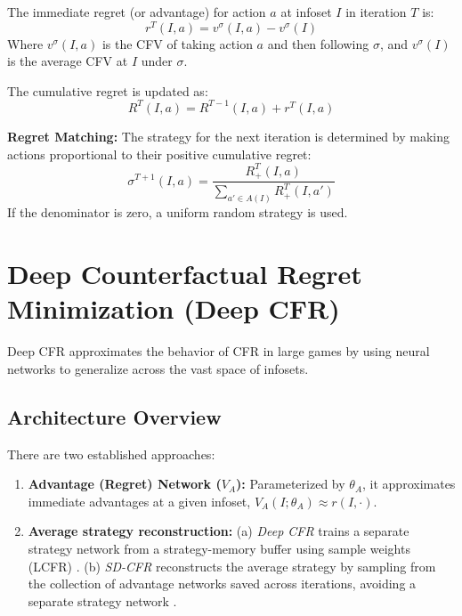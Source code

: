 \documentclass[11pt,a4paper]{article}
\begin{document}
The immediate regret (or advantage) for action $a$ at infoset $I$ in iteration $T$ is:
\begin{equation}
r^T(I, a) = v^\sigma(I, a) - v^\sigma(I)
\end{equation}
Where $v^\sigma(I, a)$ is the CFV of taking action $a$ and then following $\sigma$, and $v^\sigma(I)$ is the average CFV at $I$ under $\sigma$.

The cumulative regret is updated as:
\begin{equation}
R^T(I, a) = R^{T-1}(I, a) + r^T(I, a)
\end{equation}

\textbf{Regret Matching:} The strategy for the next iteration is determined by making actions proportional to their positive cumulative regret:
\begin{equation}
\sigma^{T+1}(I, a) = \frac{R_{+}^{T}(I, a)}{\sum_{a' \in A(I)} R_{+}^{T}(I, a')}
\end{equation}
If the denominator is zero, a uniform random strategy is used.

\section{Deep Counterfactual Regret Minimization (Deep CFR)}

Deep CFR approximates the behavior of CFR in large games by using neural networks to generalize across the vast space of infosets.

\subsection{Architecture Overview}

There are two established approaches:

\begin{enumerate}
    \item \textbf{Advantage (Regret) Network ($V_A$):} Parameterized by $\theta_A$, it approximates immediate advantages at a given infoset, $V_A(I;\theta_A)\approx r(I,\cdot)$.
    \item \textbf{Average strategy reconstruction:} (a) \emph{Deep CFR} trains a separate strategy network from a strategy-memory buffer using sample weights (LCFR) \cite{brown2018deep}. (b) \emph{SD-CFR} reconstructs the average strategy by sampling from the collection of advantage networks saved across iterations, avoiding a separate strategy network \cite{steinberger2019sdcfr}.
\end{enumerate}
\end{document}
